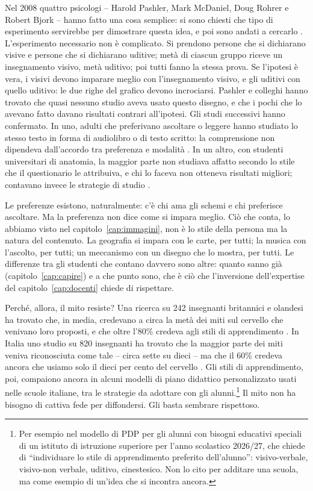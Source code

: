Nel 2008 quattro psicologi -- Harold Pashler, Mark McDaniel, Doug
Rohrer e Robert Bjork -- hanno fatto una cosa semplice: si sono chiesti
che tipo di esperimento servirebbe per dimostrare questa idea, e poi
sono andati a cercarlo \parencite{pashler2008}. L'esperimento
necessario non è complicato. Si prendono persone che si dichiarano
visive e persone che si dichiarano uditive; metà di ciascun gruppo
riceve un insegnamento visivo, metà uditivo; poi tutti fanno la
stessa prova. Se l'ipotesi è vera, i visivi devono imparare meglio con
l'insegnamento visivo, e gli uditivi con quello uditivo: le due righe
del grafico devono incrociarsi. Pashler e colleghi hanno trovato che
quasi nessuno studio aveva usato questo disegno, e che i pochi che lo
avevano fatto davano risultati contrari all'ipotesi. Gli studi
successivi hanno confermato. In uno, adulti che preferivano ascoltare o
leggere hanno studiato lo stesso testo in forma di audiolibro o di
testo scritto: la comprensione non dipendeva dall'accordo tra
preferenza e modalità \parencite{rogowsky2015}. In un altro, con
studenti universitari di anatomia, la maggior parte non studiava
affatto secondo lo stile che il questionario le attribuiva, e chi lo
faceva non otteneva risultati migliori; contavano invece le strategie
di studio \parencite{husmann2019}.

Le preferenze esistono, naturalmente: c'è chi ama gli schemi e chi
preferisce ascoltare. Ma la preferenza non dice come si impara meglio.
Ciò che conta, lo abbiamo visto nel capitolo~\ref{cap:immagini}, non
è lo stile della persona ma la natura del contenuto. La geografia si
impara con le carte, per tutti; la musica con l'ascolto, per tutti;
un meccanismo con un disegno che lo mostra, per tutti. Le differenze
tra gli studenti che contano davvero sono altre: quanto sanno già
(capitolo~\ref{cap:capire}) e a che punto sono, che è ciò che
l'inversione dell'expertise del capitolo~\ref{cap:docenti} chiede di
rispettare.

Perché, allora, il mito resiste? Una ricerca su 242 insegnanti
britannici e olandesi ha trovato che, in media, credevano a circa la
metà dei miti sul cervello che venivano loro proposti, e che oltre
l'80\% credeva agli stili di apprendimento \parencite{dekker2012}. In
Italia uno studio su 820 insegnanti ha trovato che la maggior parte
dei miti veniva riconosciuta come tale -- circa sette su dieci -- ma
che il 60\% credeva ancora che usiamo solo il dieci per cento del
cervello \parencite{bei2023}. Gli stili di apprendimento, poi,
compaiono ancora in alcuni modelli di piano didattico personalizzato
usati nelle scuole italiane, tra le strategie da adottare con gli
alunni.\footnote{Per esempio nel modello di PDP per gli alunni con
bisogni educativi speciali di un istituto di istruzione superiore per
l'anno scolastico 2026/27, che chiede di \enquote{individuare lo stile
di apprendimento preferito dell'alunno}: visivo-verbale,
visivo-non verbale, uditivo, cinestesico. Non lo cito per additare una scuola, ma come
esempio di un'idea che si incontra ancora.}
Il mito non ha bisogno di cattiva fede per diffondersi. Gli basta
sembrare rispettoso.

